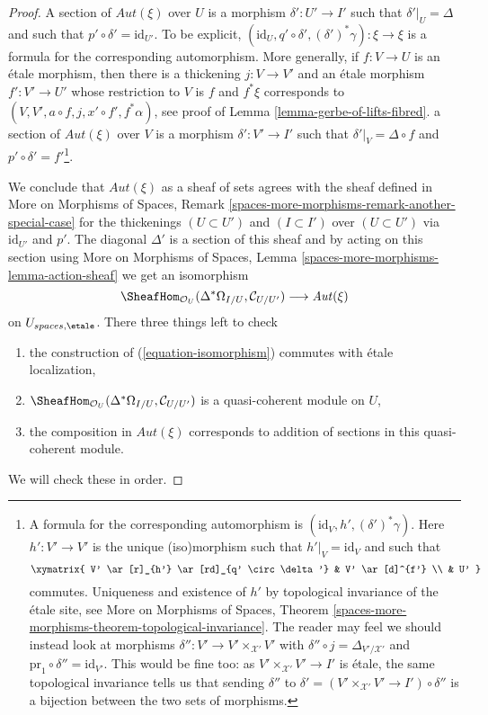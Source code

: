 \begin{proof}
\medskip\noindent
A section of $\mathit{Aut}(\xi)$ over $U$ is a morphism $\delta' : U' \to I'$
such that $\delta'|_U = \Delta$ and such that
$p' \circ \delta' = \text{id}_{U'}$. To be explicit,
$(\text{id}_U, q' \circ \delta', (\delta')^*\gamma) : \xi \to \xi$
is a formula for the corresponding automorphism.
More generally, if
$f : V \to U$ is an \'etale morphism, then there is a thickening
$j : V \to V'$ and an \'etale morphism
$f' : V' \to U'$ whose restriction to $V$ is $f$ and $f^*\xi$
corresponds to $(V, V', a \circ f, j, x' \circ f', f^*\alpha)$, see proof of
Lemma \ref{lemma-gerbe-of-lifts-fibred}.
 a section of $\mathit{Aut}(\xi)$ over $V$ is a morphism
$\delta' : V' \to I'$
such that $\delta'|_V = \Delta \circ f$
and $p' \circ \delta' = f'$\footnote{A formula for the corresponding
automorphism is $(\text{id}_V, h', (\delta')^*\gamma)$.
Here $h' : V' \to V'$ is the unique (iso)morphism such that
$h'|_V = \text{id}_V$ and such that
$$
\xymatrix{
V' \ar[r]_{h'} \ar[rd]_{q' \circ \delta'} & V' \ar[d]^{f'} \\
& U'
}
$$
commutes. Uniqueness and existence of $h'$ by topological invariance of
the \'etale site, see More on Morphisms of Spaces,
Theorem \ref{spaces-more-morphisms-theorem-topological-invariance}.
The reader may feel we should instead look at morphisms
$\delta'' : V' \to V' \times_{\mathcal{X}'} V'$ with
$\delta'' \circ j = \Delta_{V'/\mathcal{X}'}$ and
$\text{pr}_1 \circ \delta'' = \text{id}_{V'}$.
This would be fine too: as $V' \times_{\mathcal{X}'} V' \to I'$ is \'etale,
the same topological invariance tells us that sending
$\delta''$ to $\delta' = (V' \times_{\mathcal{X}'} V' \to I') \circ \delta''$
is a bijection between the two
sets of morphisms.}.

\medskip\noindent
We conclude that $\mathit{Aut}(\xi)$ as a sheaf of sets agrees with
the sheaf defined in
More on Morphisms of Spaces, Remark
\ref{spaces-more-morphisms-remark-another-special-case}
for the thickenings $(U \subset U')$ and $(I \subset I')$ over
$(U \subset U')$ via $\text{id}_{U'}$ and $p'$.
The diagonal $\Delta'$ is a section of this sheaf and by
acting on this section using More on Morphisms of Spaces, Lemma
\ref{spaces-more-morphisms-lemma-action-sheaf}
we get an isomorphism
\begin{equation}
\label{equation-isomorphism}
\SheafHom_{\mathcal{O}_U}(\Delta^*\Omega_{I/U}, \mathcal{C}_{U/U'})
\longrightarrow
\mathit{Aut}(\xi)
\end{equation}
on $U_{spaces, \etale}$. There three things left to check
\begin{enumerate}
\item the construction of (\ref{equation-isomorphism})
commutes with \'etale localization,
\item $\SheafHom_{\mathcal{O}_U}(\Delta^*\Omega_{I/U}, \mathcal{C}_{U/U'})$
is a quasi-coherent module on $U$,
\item the composition in $\mathit{Aut}(\xi)$ corresponds
to addition of sections in this quasi-coherent module.
\end{enumerate}
We will check these in order.


\end{proof}
